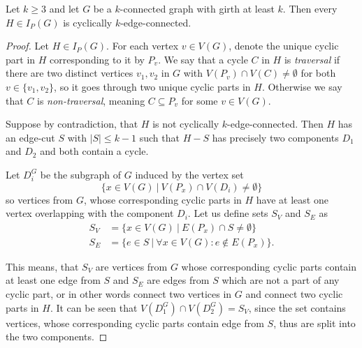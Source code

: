 \documentclass[12pt, twoside]{book}
\begin{document}
\begin{theorem}\label{th:cyclic-part-inflations}
	Let $k\geq 3$ and let $G$ be a $k$-connected graph with girth at least $k$. Then every  $H\in I_P(G)$ is cyclically $k$-edge-connected.
\end{theorem}

\begin{proof}
	Let $H\in I_P(G)$. For each vertex $v\in V(G)$, denote the unique cyclic part in $H$ corresponding to it by $P_v$. We say that a cycle $C$ in $H$ is \textit{traversal} if there are two distinct vertices $v_1,v_2$ in $G$ with $V(P_v)\cap V(C)\neq \emptyset$ for both $v\in\{v_1,v_2\}$, so it goes through two unique cyclic parts in $H$. Otherwise we say that $C$ is \textit{non-traversal}, meaning $C\subseteq P_v$ for some $v\in V(G)$.
	
	Suppose by contradiction, that $H$ is not cyclically $k$-edge-connected. Then $H$ has an edge-cut $S$ with $|S|\leq k-1$ such that $H-S$ has precisely two components $D_1$ and $D_2$ and both contain a cycle.
	
	Let $D_i^G$ be the subgraph of $G$ induced by the vertex set $$\{x\in V(G)~|~ V(P_x)\cap V(D_i)\neq \emptyset\}$$
	so vertices from $G$, whose corresponding cyclic parts in $H$ have at least one vertex overlapping with the component $D_i$. Let us define sets $S_V$ and $S_E$ as
	\begin{align*}
		S_V &= \{x\in V(G) ~|~ E(P_x)\cap S\neq \emptyset\} \\
		S_E &= \{e\in S ~|~ \forall x\in V(G): e\notin E(P_x) \}.
	\end{align*}
	
	This means, that $S_V$ are vertices from $G$ whose corresponding cyclic parts contain at least one edge from $S$ and $S_E$ are edges from $S$ which are not a part of any cyclic part, or in other words connect two vertices in $G$ and connect two cyclic parts in $H$. It can be seen that ${V(D_1^G)\cap V(D_2^G)=S_V}$, since the set contains vertices, whose corresponding cyclic parts contain edge from $S$, thus are split into the two components.
	

\end{proof}
\end{document}
